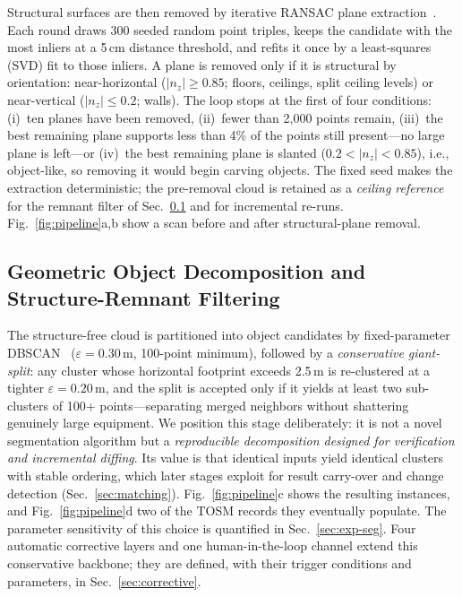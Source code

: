 Structural surfaces are then removed by iterative RANSAC plane
extraction~\cite{fischler1981ransac}. Each round draws 300 seeded random
point triples, keeps the candidate with the most inliers at a 5\,cm distance
threshold, and refits it once by a least-squares (SVD) fit to those inliers.
A plane is removed only if it is structural by orientation: near-horizontal
($|n_z|\ge0.85$; floors, ceilings, split ceiling levels) or near-vertical
($|n_z|\le0.2$; walls). The loop stops at the first of four conditions:
(i)~ten planes have been removed, (ii)~fewer than 2{,}000 points remain,
(iii)~the best remaining plane supports less than 4\% of the points still
present---no large plane is left---or (iv)~the best remaining plane is
slanted ($0.2<|n_z|<0.85$), i.e., object-like, so removing it would begin
carving objects. The fixed seed makes the extraction deterministic; the
pre-removal cloud is retained as a \emph{ceiling reference}
for the remnant filter of Sec.~\ref{sec:decomposition} and for incremental
re-runs. Fig.~\ref{fig:pipeline}a,b show a scan before and after
structural-plane removal.

\subsection{Geometric Object Decomposition and Structure-Remnant Filtering}
\label{sec:decomposition}

The structure-free cloud is partitioned into object candidates by
fixed-parameter DBSCAN~\cite{ester1996dbscan}
(\mbox{$\varepsilon=0.30$\,m}, 100-point minimum),
followed by a \emph{conservative giant-split}: any cluster whose horizontal
footprint exceeds 2.5\,m is re-clustered at a tighter
\mbox{$\varepsilon=0.20$\,m}, and the split is accepted only if it yields at
least two sub-clusters of 100+ points---separating merged neighbors without
shattering genuinely large equipment. We position this stage deliberately:
it is not a novel segmentation algorithm but a \emph{reproducible
decomposition designed for verification and incremental diffing}. Its value
is that identical inputs yield identical clusters with stable ordering, which
later stages exploit for result carry-over and change detection
(Sec.~\ref{sec:matching}). Fig.~\ref{fig:pipeline}c shows the resulting
instances, and Fig.~\ref{fig:pipeline}d two of the TOSM records they
eventually populate. The parameter sensitivity of this choice is
quantified in Sec.~\ref{sec:exp-seg}. Four automatic corrective layers and
one human-in-the-loop channel extend this conservative backbone; they are
defined, with their trigger conditions and parameters, in
Sec.~\ref{sec:corrective}.

